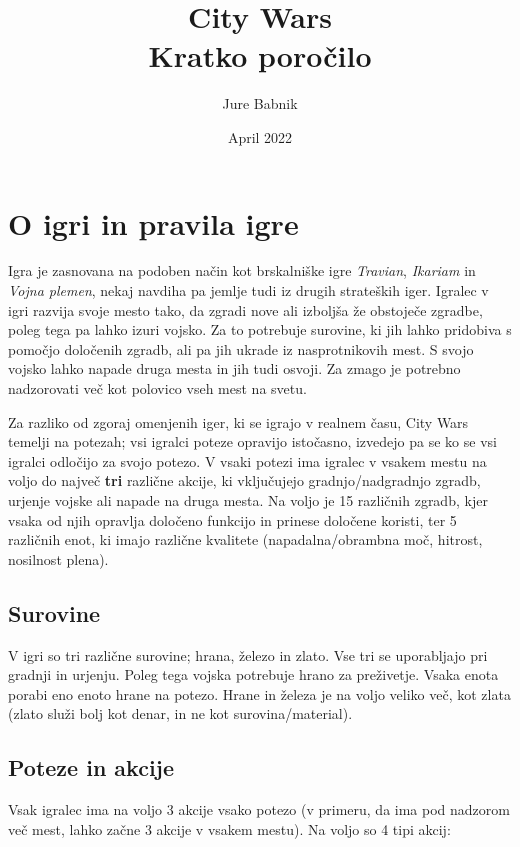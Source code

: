 \documentclass[a4paper, 16pt]{article}
\title{City Wars \\ Kratko poročilo}
\date{April 2022}
\author{Jure Babnik}
\begin{document}
\maketitle

\section{O igri in pravila igre}

Igra je zasnovana na podoben način kot brskalniške igre \textit{Travian}, \textit{Ikariam} in \textit{Vojna plemen}, nekaj navdiha pa jemlje tudi iz drugih strateških iger.
Igralec v igri razvija svoje mesto tako, da zgradi nove ali izboljša že obstoječe zgradbe, poleg tega pa lahko izuri vojsko. Za to potrebuje surovine, ki jih lahko pridobiva s pomočjo določenih zgradb, 
ali pa jih ukrade iz nasprotnikovih mest. S svojo vojsko lahko napade druga mesta in jih tudi osvoji. Za zmago je potrebno nadzorovati več kot polovico vseh mest na svetu.

Za razliko od zgoraj omenjenih iger, ki se igrajo v realnem času, City Wars temelji na potezah; vsi igralci poteze opravijo istočasno, izvedejo pa se ko se vsi igralci odločijo za svojo potezo. 
V vsaki potezi ima igralec v vsakem mestu na voljo 
do največ \textbf{tri} različne akcije, ki vključujejo gradnjo/nadgradnjo zgradb, urjenje vojske ali napade na druga mesta. Na voljo je 15 različnih zgradb, kjer vsaka od njih 
opravlja določeno funkcijo in prinese določene koristi, ter 5 različnih enot, ki imajo različne kvalitete (napadalna/obrambna moč, hitrost, nosilnost plena).

\subsection{Surovine}

V igri so tri različne surovine; hrana, železo in zlato. Vse tri se uporabljajo pri gradnji in urjenju. Poleg tega vojska potrebuje hrano za preživetje. Vsaka enota porabi eno enoto hrane na potezo.
Hrane in železa je na voljo veliko več, kot zlata (zlato služi bolj kot denar, in ne kot surovina/material).

\subsection{Poteze in akcije}

Vsak igralec ima na voljo 3 akcije vsako potezo (v primeru, da ima pod nadzorom več mest, lahko začne 3 akcije v vsakem mestu). Na voljo so 4 tipi akcij:
\end{document}
